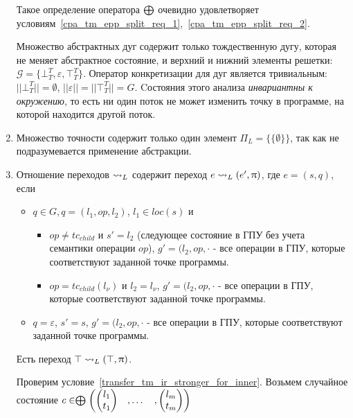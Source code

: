 \begin{enumerate}
Такое определение оператора $\mathrel{\bigoplus}$ очевидно удовлетворяет условиям~\ref{cpa_tm_epp_split_req_1},~\ref{cpa_tm_epp_split_req_2}.

Множество абстрактных дуг содержит только тождественную дугу, которая не меняет абстрактное состояние, и верхний и нижний элементы решетки: $\mathcal{G} = \{\bot^T_T, \varepsilon, \top^T_T\}$.
Оператор конкретизации для дуг является тривиальным: $||\bot^T_T|| = \emptyset$, $||\varepsilon|| = ||\top^T_T|| = G$.
Cостояния этого анализа {\em инвариантны к окружению}, то есть ни один поток не может изменить точку в программе, на которой находится другой поток.

\item Множество точности содержит только один элемент $\Pi_L = \{\{\emptyset\}\}$, так как не подразумевается применение абстракции.

\item Отношение переходов $\leadsto_L$ содержит переход $e \leadsto_L (e', \uppi)$, где $e = (s, q)$, если 
\begin{itemize}
\item $q \in G, q=(l_1,op,l_2)$, $l_1 \in loc(s)$ и
\begin{itemize}
\item $op \neq tc_{child}$ и $s' = l_2$ (следующее состояние в ГПУ без учета семантики операции $op$), $g' = (l_2, op, \cdot$ - все операции в ГПУ, которые соответствуют заданной точке программы.
\item $op=tc_{child}(l_\nu)$ и $l_2 = l_\nu$, $g' = (l_2, op, \cdot$ - все операции в ГПУ, которые соответствуют заданной точке программы.
\end{itemize}
\item $q = \varepsilon$, $s'=s$, $g' = (l_2, op, \cdot$ - все операции в ГПУ, которые соответствуют заданной точке программы.
\end{itemize}

Есть переход $\top \leadsto_L (\top, \uppi)$.

Проверим условие~\ref{transfer_tm_ir_stronger_for_inner}.
Возьмем случайное состояние $c \in \mathrel{\bigoplus}
\begin{pmatrix}
\begin{pmatrix}
l_1 \\
t_1 
\end{pmatrix}& ,
\dots& ,
\begin{pmatrix}
l_m \\
t_m 
\end{pmatrix}
\end{pmatrix}$


\end{enumerate}
